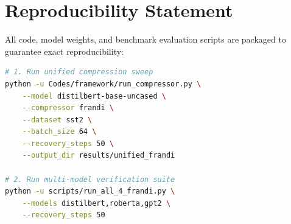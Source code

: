 \section{Reproducibility Statement}
All code, model weights, and benchmark evaluation scripts are packaged to guarantee exact reproducibility:
\begin{lstlisting}[language=bash]
# 1. Run unified compression sweep
python -u Codes/framework/run_compressor.py \
    --model distilbert-base-uncased \
    --compressor frandi \
    --dataset sst2 \
    --batch_size 64 \
    --recovery_steps 50 \
    --output_dir results/unified_frandi

# 2. Run multi-model verification suite
python -u scripts/run_all_4_frandi.py \
    --models distilbert,roberta,gpt2 \
    --recovery_steps 50
\end{lstlisting}
